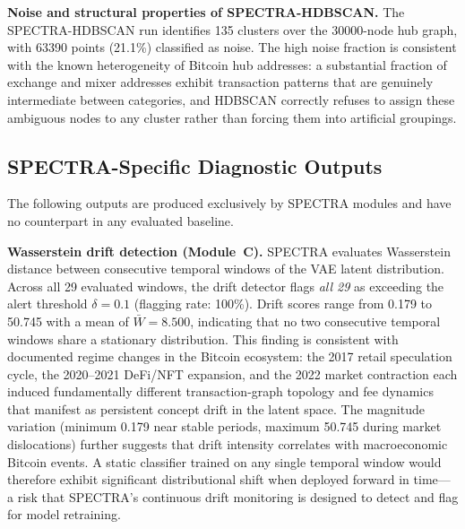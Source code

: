 \documentclass[journal]{IEEEtran}
\begin{document}
\textbf{Noise and structural properties of SPECTRA-HDBSCAN.}
The SPECTRA-HDBSCAN run identifies \num{135} clusters over the
\num{30000}-node hub graph, with \num{63390} points (\num{21.1}\%)
classified as noise.
The high noise fraction is consistent with the known heterogeneity of
Bitcoin hub addresses: a substantial fraction of exchange and mixer addresses
exhibit transaction patterns that are genuinely intermediate between
categories, and HDBSCAN correctly refuses to assign these ambiguous
nodes to any cluster rather than forcing them into artificial groupings.


\subsection{SPECTRA-Specific Diagnostic Outputs}
\label{subsec:spectra_outputs}

The following outputs are produced exclusively by SPECTRA modules and
have no counterpart in any evaluated baseline.

\textbf{Wasserstein drift detection (Module~C).}
SPECTRA evaluates Wasserstein distance between consecutive temporal windows
of the VAE latent distribution.
Across all \num{29} evaluated windows, the drift detector flags
\emph{all \num{29}} as exceeding the alert threshold $\delta = 0.1$
(flagging rate: \num{100}\%).
Drift scores range from \num{0.179} to \num{50.745} with a mean of
$\bar{W} = \num{8.500}$, indicating that no two consecutive temporal
windows share a stationary distribution.
This finding is consistent with documented regime changes in the Bitcoin
ecosystem: the 2017 retail speculation cycle, the 2020--2021
DeFi/NFT expansion, and the 2022 market contraction each induced
fundamentally different transaction-graph topology and fee dynamics that
manifest as persistent concept drift in the latent space.
The magnitude variation (minimum \num{0.179} near stable periods,
maximum \num{50.745} during market dislocations) further suggests
that drift intensity correlates with macroeconomic Bitcoin events.
A static classifier trained on any single temporal window would therefore
exhibit significant distributional shift when deployed forward in time---
a risk that SPECTRA's continuous drift monitoring is designed to detect
and flag for model retraining.
\end{document}
